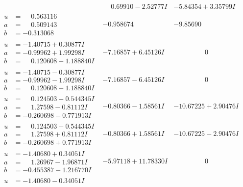 \documentclass[1p]{elsarticle_modified}
\theoremstyle{definition}
\begin{document}
$$\begin{array}{c|c|c}
 & \phantom{-}0.69910 - 2.52777 I & -5.84354 + 3.35799 I \\ \hline\begin{aligned}
u &= \phantom{-}0.563116\phantom{ +0.000000I} \\
a &= \phantom{-}0.509143\phantom{ +0.000000I} \\
b &= -0.313068\phantom{ +0.000000I}\end{aligned}
 & -0.958674\phantom{ +0.000000I} & -9.85690\phantom{ +0.000000I} \\ \hline\begin{aligned}
u &= -1.40715 + 0.30877 I \\
a &= -0.99962 + 1.99298 I \\
b &= \phantom{-}0.120608 + 1.188840 I\end{aligned}
 & -7.16857 + 6.45126 I & \phantom{-0.000000 } 0 \\ \hline\begin{aligned}
u &= -1.40715 - 0.30877 I \\
a &= -0.99962 - 1.99298 I \\
b &= \phantom{-}0.120608 - 1.188840 I\end{aligned}
 & -7.16857 - 6.45126 I & \phantom{-0.000000 } 0 \\ \hline\begin{aligned}
u &= \phantom{-}0.124503 + 0.544345 I \\
a &= \phantom{-}1.27598 - 0.81112 I \\
b &= -0.260698 - 0.771913 I\end{aligned}
 & -0.80366 - 1.58561 I & -10.67225 + 2.90476 I \\ \hline\begin{aligned}
u &= \phantom{-}0.124503 - 0.544345 I \\
a &= \phantom{-}1.27598 + 0.81112 I \\
b &= -0.260698 + 0.771913 I\end{aligned}
 & -0.80366 + 1.58561 I & -10.67225 - 2.90476 I \\ \hline\begin{aligned}
u &= -1.40680 + 0.34051 I \\
a &= \phantom{-}1.26967 - 1.96871 I \\
b &= -0.455387 - 1.216770 I\end{aligned}
 & -5.97118 + 11.78330 I & \phantom{-0.000000 } 0 \\ \hline\begin{aligned}
u &= -1.40680 - 0.34051 I \\

\end{aligned}
\end{array}$$
\end{document}
